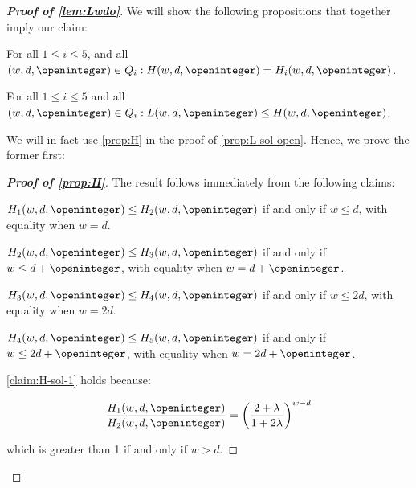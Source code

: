\begin{proof}[\textbf{Proof of \cref{lem:Lwdo}}]
 We will show the following propositions that together imply our claim:

\begin{proposition}
\label{prop:H}
For all $1\le i\le 5$, and all $(w, d, \openinteger)\in Q_i: H(w, d, \openinteger) = H_i(w, d, \openinteger)$.
\end{proposition}


\begin{proposition}
\label{prop:L-sol-open}
For all $1\le i\le 5$ and all $(w, d, \openinteger)\in Q_i: L(w, d, \openinteger) \le H(w, d, \openinteger)$.
\end{proposition}

We will in fact use \cref{prop:H} in the proof of \cref{prop:L-sol-open}. Hence, we prove the former first:


\begin{proof}[\textbf{Proof of \cref{prop:H}}]
The result follows immediately from the following claims:

\begin{claim}
\label{claim:H-sol-1}
$H_1(w, d, \openinteger) \leq H_2(w, d, \openinteger)$ if and only if $w \leq d$, with equality when $w = d$.
\end{claim}

\begin{claim}
\label{claim:H-sol-2}
$H_2(w, d, \openinteger) \leq H_3(w, d, \openinteger)$ if and only if $w \leq d + \openinteger$, with equality when $w = d + \openinteger$.
\end{claim}

\begin{claim}
\label{claim:H-sol-3}
$H_3(w, d, \openinteger) \leq H_4(w, d, \openinteger)$ if and only if $w \leq 2d$, with equality when $w = 2d$.
\end{claim}

\begin{claim}
\label{claim:H-sol-4}
$H_4(w, d, \openinteger) \leq H_5(w, d, \openinteger)$ if and only if $w \leq 2d+\openinteger$, with equality when $w = 2d+\openinteger$.
\end{claim}

\cref{claim:H-sol-1} holds because: 

\begin{equation*}
\frac{H_1(w, d, \openinteger)}{H_2(w, d, \openinteger)} = \left(\frac{2+\lambda}{1+2\lambda}\right)^{w-d}
\end{equation*}

which is greater than 1 if and only if $w > d$.


\end{proof}
\end{proof}
